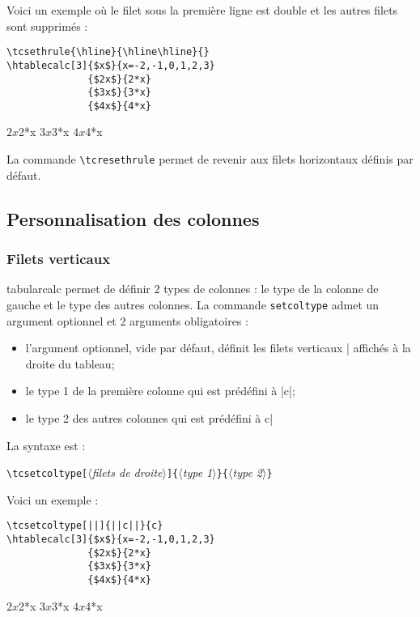 \documentclass[a4paper,10pt]{article}
\newcommand\guill[1]{\og{}#1\fg{}}
\newcommand\argu[1]{$\langle$\textit{#1}$\rangle$}
\newcommand\ARGU[1]{\texttt{\{}\argu{#1}\texttt{\}}}
\newcommand\arguC[1]{\texttt{[}\argu{#1}\texttt{]}}
\newcommand\tbcalc{\textsf{tabularcalc}\xspace}
\newcommand\verbinline{\lstinline[breaklines=false,basicstyle=\normalsize\ttfamily]}
\newcommand\mywidth{0.85\linewidth}
\begin{document}
Voici un exemple où le filet sous la première ligne est double et les autres filets sont supprimés :
\begin{center}
\begin{minipage}{\mywidth}
\begin{lstlisting}
\tcsethrule{\hline}{\hline\hline}{}
\htablecalc[3]{$x$}{x=-2,-1,0,1,2,3}
              {$2x$}{2*x}
              {$3x$}{3*x}
              {$4x$}{4*x}
\end{lstlisting}
\end{minipage}

\tcsethrule{\hline}{\hline\hline}{}
              {$2x$}{2*x}
              {$3x$}{3*x}
              {$4x$}{4*x}
\end{center}

La commande \verbinline|\tcresethrule| permet de revenir aux filets horizontaux définis par défaut.

\subsection{Personnalisation des colonnes}
\subsubsection{Filets verticaux}
\tbcalc permet de définir 2 types de colonnes : le type de la colonne de gauche et le type des autres colonnes. La commande \verbinline|setcoltype| admet un argument optionnel et 2 arguments obligatoires :
\begin{itemize}
	\item l'argument optionnel, vide par défaut, définit les filets verticaux \guill{|} affichés à la droite du tableau;
	\item le type 1 de la première colonne qui est prédéfini à \guill{|c|};
	\item le type 2 des autres colonnes qui est prédéfini à \guill{c|}
\end{itemize}\medskip

La syntaxe est :\par\nobreak
\verbinline|\tcsetcoltype|\arguC{filets de droite}\ARGU{type 1}\ARGU{type 2}\medskip

Voici un exemple :
\begin{center}
\begin{minipage}{\mywidth}
\begin{lstlisting}
\tcsetcoltype[||]{||c||}{c}
\htablecalc[3]{$x$}{x=-2,-1,0,1,2,3}
              {$2x$}{2*x}
              {$3x$}{3*x}
              {$4x$}{4*x}
\end{lstlisting}
\end{minipage}

              {$2x$}{2*x}
              {$3x$}{3*x}
              {$4x$}{4*x}
\end{center}
\end{document}
